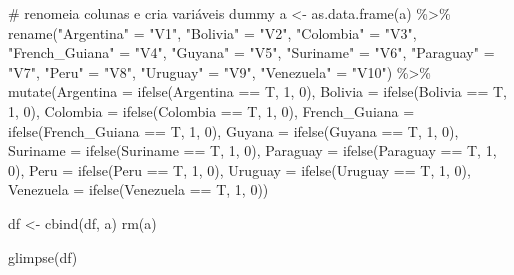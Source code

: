 \documentclass[
  letterpaper,
  DIV=11,
  numbers=noendperiod]{scrartcl}
\newenvironment{Shaded}{\begin{snugshade}}{\end{snugshade}}
\newcommand{\AttributeTok}[1]{\textcolor[rgb]{0.40,0.45,0.13}{#1}}
\newcommand{\CommentTok}[1]{\textcolor[rgb]{0.37,0.37,0.37}{#1}}
\newcommand{\DecValTok}[1]{\textcolor[rgb]{0.68,0.00,0.00}{#1}}
\newcommand{\FunctionTok}[1]{\textcolor[rgb]{0.28,0.35,0.67}{#1}}
\newcommand{\NormalTok}[1]{\textcolor[rgb]{0.00,0.23,0.31}{#1}}
\newcommand{\OtherTok}[1]{\textcolor[rgb]{0.00,0.23,0.31}{#1}}
\newcommand{\SpecialCharTok}[1]{\textcolor[rgb]{0.37,0.37,0.37}{#1}}
\newcommand{\StringTok}[1]{\textcolor[rgb]{0.13,0.47,0.30}{#1}}
\begin{document}
\begin{Shaded}
\begin{Highlighting}[]
\CommentTok{\# renomeia colunas e cria variáveis dummy}
\NormalTok{a }\OtherTok{\textless{}{-}} \FunctionTok{as.data.frame}\NormalTok{(a) }\SpecialCharTok{\%\textgreater{}\%}
  \FunctionTok{rename}\NormalTok{(}\StringTok{"Argentina"} \OtherTok{=} \StringTok{"V1"}\NormalTok{,}
         \StringTok{"Bolivia"} \OtherTok{=} \StringTok{"V2"}\NormalTok{,}
         \StringTok{"Colombia"} \OtherTok{=} \StringTok{"V3"}\NormalTok{,}
         \StringTok{"French\_Guiana"} \OtherTok{=} \StringTok{"V4"}\NormalTok{,}
         \StringTok{"Guyana"} \OtherTok{=} \StringTok{"V5"}\NormalTok{,}
         \StringTok{"Suriname"} \OtherTok{=} \StringTok{"V6"}\NormalTok{,}
         \StringTok{"Paraguay"} \OtherTok{=} \StringTok{"V7"}\NormalTok{,}
         \StringTok{"Peru"} \OtherTok{=} \StringTok{"V8"}\NormalTok{,}
         \StringTok{"Uruguay"} \OtherTok{=} \StringTok{"V9"}\NormalTok{,}
         \StringTok{"Venezuela"} \OtherTok{=} \StringTok{"V10"}\NormalTok{) }\SpecialCharTok{\%\textgreater{}\%}
  \FunctionTok{mutate}\NormalTok{(}\AttributeTok{Argentina =} \FunctionTok{ifelse}\NormalTok{(Argentina }\SpecialCharTok{==}\NormalTok{ T, }\DecValTok{1}\NormalTok{, }\DecValTok{0}\NormalTok{),}
         \AttributeTok{Bolivia =} \FunctionTok{ifelse}\NormalTok{(Bolivia }\SpecialCharTok{==}\NormalTok{ T, }\DecValTok{1}\NormalTok{, }\DecValTok{0}\NormalTok{),}
         \AttributeTok{Colombia =} \FunctionTok{ifelse}\NormalTok{(Colombia }\SpecialCharTok{==}\NormalTok{ T, }\DecValTok{1}\NormalTok{, }\DecValTok{0}\NormalTok{),}
         \AttributeTok{French\_Guiana =} \FunctionTok{ifelse}\NormalTok{(French\_Guiana }\SpecialCharTok{==}\NormalTok{ T, }\DecValTok{1}\NormalTok{, }\DecValTok{0}\NormalTok{),}
         \AttributeTok{Guyana =} \FunctionTok{ifelse}\NormalTok{(Guyana }\SpecialCharTok{==}\NormalTok{ T, }\DecValTok{1}\NormalTok{, }\DecValTok{0}\NormalTok{),}
         \AttributeTok{Suriname =} \FunctionTok{ifelse}\NormalTok{(Suriname }\SpecialCharTok{==}\NormalTok{ T, }\DecValTok{1}\NormalTok{, }\DecValTok{0}\NormalTok{),}
         \AttributeTok{Paraguay =} \FunctionTok{ifelse}\NormalTok{(Paraguay }\SpecialCharTok{==}\NormalTok{ T, }\DecValTok{1}\NormalTok{, }\DecValTok{0}\NormalTok{),}
         \AttributeTok{Peru =} \FunctionTok{ifelse}\NormalTok{(Peru }\SpecialCharTok{==}\NormalTok{ T, }\DecValTok{1}\NormalTok{, }\DecValTok{0}\NormalTok{),}
         \AttributeTok{Uruguay =} \FunctionTok{ifelse}\NormalTok{(Uruguay }\SpecialCharTok{==}\NormalTok{ T, }\DecValTok{1}\NormalTok{, }\DecValTok{0}\NormalTok{),}
         \AttributeTok{Venezuela =} \FunctionTok{ifelse}\NormalTok{(Venezuela }\SpecialCharTok{==}\NormalTok{ T, }\DecValTok{1}\NormalTok{, }\DecValTok{0}\NormalTok{))}

\NormalTok{df }\OtherTok{\textless{}{-}} \FunctionTok{cbind}\NormalTok{(df, a)}
\FunctionTok{rm}\NormalTok{(a)}

\FunctionTok{glimpse}\NormalTok{(df)}
\end{Highlighting}
\end{Shaded}
\end{document}
